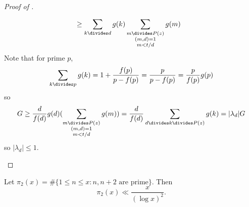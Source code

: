 \documentclass[a4paper]{article}
\begin{document}
\begin{proof}[Proof of ]
\begin{enumerate}
\begin{align*}
      &\geq \sum_{k \divides d} g(k) \sum_{\substack{m \divides P(z) \\ (m, d) = 1 \\ m < t/d}} g(m)
    \end{align*}
    Note that for prime \(p\),
    \[
      \sum_{k \divides p} g(k)
      = 1 + \frac{f(p)}{p - f(p)}
      = \frac{p}{p - f(p)}
      = \frac{p}{f(p)} g(p)
    \]
    so
    \[
      G
      \geq \frac{d}{f(d)} g(d) ( \sum_{\substack{m \divides P(z) \\ (m, d) = 1 \\ m < t/d}} g(m))
      = \frac{d}{f(d)} \sum_{d \divides k \divides P(z)} g(k)
      = |\lambda_d| G
    \]
    so \(|\lambda_d| \leq 1\).
  \end{enumerate}
\end{proof}

\begin{theorem}[Brun]
  Let \(\pi_2(x) = \#\{1 \leq n \leq x: n, n + 2 \text{ are prime}\}\). Then
  \[
    \pi_2(x) \ll \frac{x}{(\log x)^2}.
  \]
\end{theorem}
\end{document}
